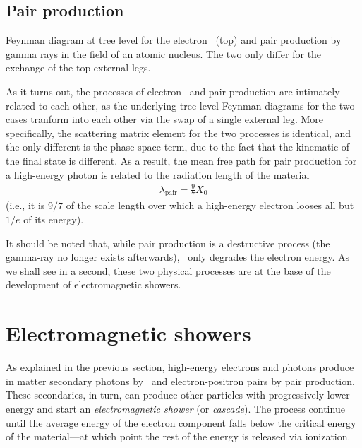 \subsection{Pair production}

\begin{marginfigure}
  
  \caption{Feynman diagram at tree level for the electron \bremss\ (top) and pair
  production by gamma rays in the field of an atomic nucleus. The two only differ
  for the exchange of the top external legs.}
  \label{fig:em_shower_feynman}
\end{marginfigure}

As it turns out, the processes of electron \bremss\ and pair production are intimately
related to each other, as the underlying tree-level Feynman diagrams for the two
cases tranform into each other via the swap of a single external leg. More specifically,
the scattering matrix element for the two processes is identical, and the only
different is the phase-space term, due to the fact that the kinematic of the final
state is different. As a result, the mean free path for pair production for a
high-energy photon is related to the radiation length of the material
\begin{align}\label{eq:lambda_pair}
  \lambda_\text{pair} = \frac{9}{7}X_0
\end{align}
(i.e., it is $9/7$ of the scale length over which a high-energy electron
looses all but $1/e$ of its energy).

It should be noted that, while pair production is a destructive process
(the gamma-ray no longer exists afterwards), \bremss\ only degrades the
electron energy. As we shall see in a second, these two physical processes are
at the base of the development of electromagnetic showers.


\section{Electromagnetic showers}%
\label{sec:em_showers}

As explained in the previous section, high-energy electrons and photons
produce in matter secondary photons by \bremss\ and electron-positron
pairs by pair production. These secondaries, in turn, can produce other
particles with progressively lower energy and start an
\emph{electromagnetic shower} (or \emph{cascade}).
The process continue until the average energy of the electron component falls
below the critical energy of the material---at which point the rest of the
energy is released via ionization.

